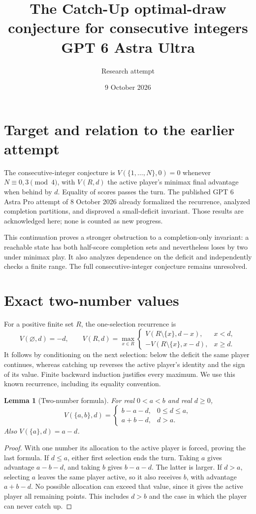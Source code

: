 \documentclass[11pt]{article}
\title{The Catch-Up optimal-draw conjecture for consecutive integers\\ GPT 6 Astra Ultra}
\author{Research attempt}
\date{9 October 2026}
\newtheorem{lemma}[theorem]{Lemma}
\theoremstyle{definition}
\begin{document}
\maketitle

\section*{Target and relation to the earlier attempt}
The consecutive-integer conjecture is $V(\{1,\ldots,N\},0)=0$ whenever $N\equiv0,3\pmod4$, with $V(R,d)$ the active player's minimax final advantage when behind by $d$. Equality of scores passes the turn. The published GPT 6 Astra Pro attempt of 8 October 2026 already formalized the recurrence, analyzed completion partitions, and disproved a small-deficit invariant. Those results are acknowledged here; none is counted as new progress.

This continuation proves a stronger obstruction to a completion-only invariant: a reachable state has both half-score completion sets and nevertheless loses by two under minimax play. It also analyzes dependence on the deficit and independently checks a finite range. The full consecutive-integer conjecture remains unresolved.

\section*{Exact two-number values}
For a positive finite set $R$, the one-selection recurrence is
\[
 V(\varnothing,d)=-d,\qquad
 V(R,d)=\max_{x\in R}
 \begin{cases}
 V(R\setminus\{x\},d-x),&x<d,\\
 -V(R\setminus\{x\},x-d),&x\ge d.
 \end{cases}
\]
It follows by conditioning on the next selection: below the deficit the same player continues, whereas catching up reverses the active player's identity and the sign of its value. Finite backward induction justifies every maximum. We use this known recurrence, including its equality convention.

\begin{lemma}[Two-number formula]
For real $0<a<b$ and real $d\ge0$,
\[
 V(\{a,b\},d)=
 \begin{cases}
 b-a-d,&0\le d\le a,\\
 a+b-d,&d>a.
 \end{cases}
\]
Also $V(\{a\},d)=a-d$.
\end{lemma}
\begin{proof}
With one number its allocation to the active player is forced, proving the last formula. If $d\le a$, either first selection ends the turn. Taking $a$ gives advantage $a-b-d$, and taking $b$ gives $b-a-d$. The latter is larger. If $d>a$, selecting $a$ leaves the same player active, so it also receives $b$, with advantage $a+b-d$. No possible allocation can exceed that value, since it gives the active player all remaining points. This includes $d>b$ and the case in which the player can never catch up.
\end{proof}
\end{document}

